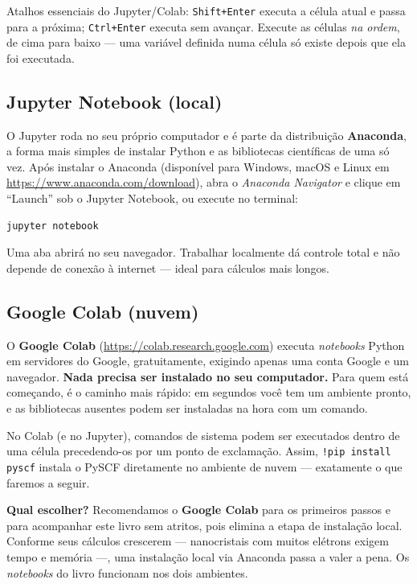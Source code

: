 \documentclass[11pt,a4paper,openany]{book}
\newcommand{\code}[1]{\texttt{#1}}
\newcommand{\pyscf}{\textsf{PySCF}}
\newcommand{\python}{\textsf{Python}}
\begin{document}
\begin{caixadica}
Atalhos essenciais do Jupyter/Colab: \texttt{Shift+Enter} executa a célula atual
e passa para a próxima; \texttt{Ctrl+Enter} executa sem avançar. Execute as
células \emph{na ordem}, de cima para baixo --- uma variável definida numa célula
só existe depois que ela foi executada.
\end{caixadica}

\subsection{Jupyter Notebook (local)}

O Jupyter roda no seu próprio computador e é parte da distribuição
\textbf{Anaconda}, a forma mais simples de instalar \python{} e as bibliotecas
científicas de uma só vez. Após instalar o Anaconda (disponível para Windows,
macOS e Linux em \url{https://www.anaconda.com/download}), abra o
\emph{Anaconda Navigator} e clique em ``Launch'' sob o Jupyter Notebook, ou
execute no terminal:

\begin{lstlisting}[style=console]
jupyter notebook
\end{lstlisting}

\noindent
Uma aba abrirá no seu navegador. Trabalhar localmente dá controle total e não
depende de conexão à internet --- ideal para cálculos mais longos.

\subsection{Google Colab (nuvem)}

O \textbf{Google Colab} (\url{https://colab.research.google.com}) executa
\emph{notebooks} \python{} em servidores do Google, gratuitamente, exigindo apenas
uma conta Google e um navegador. \textbf{Nada precisa ser instalado no seu
computador.} Para quem está começando, é o caminho mais rápido: em segundos você
tem um ambiente pronto, e as bibliotecas ausentes podem ser instaladas na hora
com um comando.

\begin{caixadica}
No Colab (e no Jupyter), comandos de sistema podem ser executados dentro de uma
célula precedendo-os por um ponto de exclamação. Assim, \code{!pip install pyscf}
instala o \pyscf{} diretamente no ambiente de nuvem --- exatamente o que faremos a
seguir.
\end{caixadica}

\begin{caixanota}
\textbf{Qual escolher?} Recomendamos o \textbf{Google Colab} para os primeiros
passos e para acompanhar este livro sem atritos, pois elimina a etapa de
instalação local. Conforme seus cálculos crescerem --- nanocristais com muitos
elétrons exigem tempo e memória ---, uma instalação local via Anaconda passa a
valer a pena. Os \emph{notebooks} do livro funcionam nos dois ambientes.
\end{caixanota}
\end{document}
